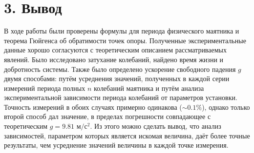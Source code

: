 \documentclass[a4paper]{article}
\begin{document}
\section*{\textbf{3. Вывод}}
\noindent
В ходе работы были проверены формулы для периода физического маятника и теорема Гюйгенса об обратимости точек опоры. Полученные экспериментальные данные хорошо согласуются с теоретическим описанием рассматриваемых явлений. Было исследовано затухание колебаний, найдено время жизни и добротность системы. Также было определено ускорение свободного падения $g$ двумя способами: путём усреднения значений, полученных в каждой серии измерений периода полных $n$ колебаний маятника и путём анализа экспериментальной зависимости периода колебаний от параметров установки. Точность измерений в обоих случаях примерно одинакова ($\sim 0.1 \%$), однако только второй способ дал значение, в пределах погрешности совпадающее с теоретическим $g = 9.81 \text{ м}/\text{с}^2$. Из этого можно сделать вывод, что анализ зависимостей, параметром которых является искомая величина, даёт более точные результаты, чем усреднение значений величины в каждой точке измерения. 
\end{document}
